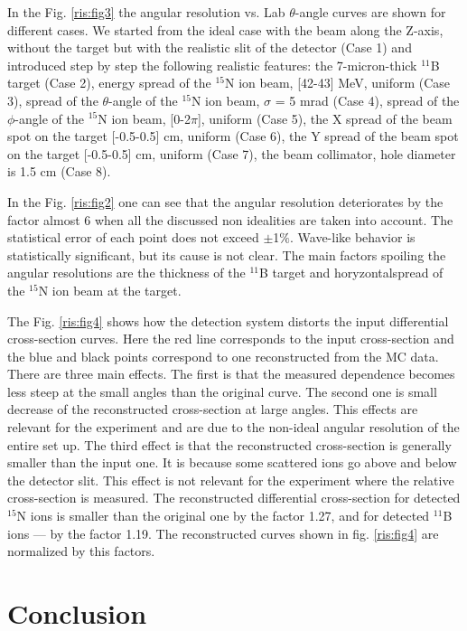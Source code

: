 \documentclass[%
 aip,
cp,  %
 amsmath,amssymb,%
 reprint,%
]{revtex4-2}
\begin{document}
In the Fig. \ref{ris:fig3} the angular resolution vs. Lab $\theta$-angle curves are shown for different cases. We started from the ideal case with the beam along the Z-axis, without the target but with the realistic slit of the detector (Case 1) and introduced step by step the following realistic features: the 7-micron-thick ${}^{11}$B target (Case 2), energy spread of the ${}^{15}$N ion beam, [42-43] MeV, uniform (Case 3), spread of the $\theta$-angle of the ${}^{15}$N ion beam, $\sigma$ = 5 mrad (Case 4),  spread of the $\phi$-angle of the ${}^{15}$N ion beam, [0-2$\pi$], uniform (Case 5), the X spread of the beam spot on the target [-0.5-0.5] cm, uniform (Case 6), the Y spread of the beam spot on the target [-0.5-0.5] cm, uniform (Case 7), the beam collimator, hole diameter is 1.5 cm  (Case 8).


In the Fig. \ref{ris:fig2} one can see that the angular resolution deteriorates by the factor almost 6 when all the discussed non idealities are taken into account. The statistical error of each point does not exceed $\pm$1$\%$. Wave-like behavior is statistically significant, but its cause is not clear. The main factors spoiling the angular resolutions are the thickness of the ${}^{11}$B target and horyzontalspread of the ${}^{15}$N ion beam at the target.

The Fig. \ref{ris:fig4} shows how the detection system distorts the input differential cross-section curves. Here the red line corresponds to the input cross-section and the blue and black points correspond to one reconstructed from the MC data. There are three main effects. The first is that the measured dependence becomes less steep at the small angles than the original curve. The second one is small decrease of the reconstructed cross-section at large angles. This effects are relevant for the experiment and are due to the non-ideal angular resolution of the entire set up.
The third effect is that the reconstructed cross-section is generally smaller than the input one. It is because some scattered ions go above and below the detector slit. This effect is not relevant for the experiment where the relative cross-section is measured. The reconstructed differential cross-section for detected ${}^{15}$N ions is smaller than the original one by the factor 1.27, and for detected ${}^{11}$B ions --- by the factor 1.19.  The reconstructed curves shown in  fig. \ref{ris:fig4} are normalized by this factors.

\section{Conclusion}
\end{document}
